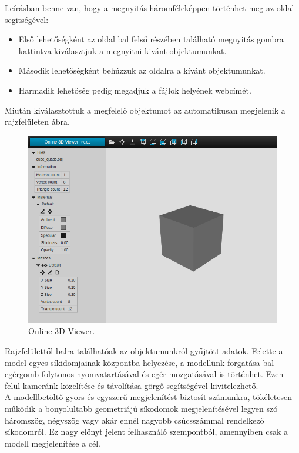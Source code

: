 Leírásban benne van, hogy a megnyitás háromféleképpen történhet meg az oldal segitségével:
\begin{itemize}
\item Első lehetőségként az oldal bal felső részében található megnyitás gombra kattintva kiválasztjuk a megnyitni kivánt objektumunkat.
\item Második lehetőségként behúzzuk az oldalra a kívánt objektumunkat.
\item Harmadik lehetőség pedig megadjuk a fájlok helyének webcímét.
\end{itemize}
\newpage
Miután kiválasztottuk a megfelelő objektumot az automatikusan megjelenik a rajzfelületen  ábra.
\begin{figure}[h]
\centering
\includegraphics[width=\textwidth]{images/Model_Viewer_2.png}
\caption{Online 3D Viewer.}
\label{fig:model_viewer2}
\end{figure}

Rajzfelülettől balra találhatóak az objektumunkról gyűjtött adatok. Felette a model egyes síkidomjainak központba helyezése, a modellünk forgatása bal egérgomb folytonos nyomvatartásával és egér mozgatásával is történhet. Ezen felül kameránk közelítése és távolítása görgő segítségével kivitelezhető.\\

A modellbetöltő gyors és egyszerű megjelenítést biztosít számunkra, tökéletesen működik a bonyolultabb geometriájú síkodomok megjelenítésével legyen szó háromszög, négyszög vagy akár ennél nagyobb csúcsszámmal rendelkező síkodomról. Ez nagy előnyt jelent felhasználó szempontból, amennyiben csak a modell megjelenítése a cél.\\

